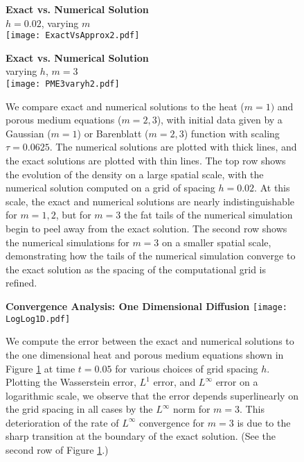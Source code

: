 \documentclass[11pt,leqno]{amsart}
\theoremstyle{definition}
\begin{document}
\begin{figure}[!ht] 
\centering
\textbf{Exact vs. Numerical Solution} \\
$h = 0.02$, varying $m$ \\ \smallskip
\hspace*{-1.4cm}
\texttt{[image: ExactVsApprox2.pdf]}

\textbf{Exact vs. Numerical Solution} \\
varying $h$, $m = 3$ \\ \smallskip
\hspace*{-1.35cm}
\texttt{[image: PME3varyh2.pdf]}
	\caption{We compare exact and numerical solutions to the heat ($m=1)$ and porous medium equations ($m=2,3$), with initial data given by a Gaussian ($m=1$) or Barenblatt ($m=2, 3$) function with scaling $\tau = 0.0625$. The numerical solutions are plotted with thick lines, and the exact solutions are plotted with thin lines. The top row shows the evolution of the density on a large spatial scale, with the numerical solution computed on a grid of spacing $h=0.02$. At this scale, the exact and numerical solutions are nearly indistinguishable  for $m=1,2$, but for $m=3$ the fat tails of the numerical simulation begin to peel away from the exact solution. The second row shows the numerical simulations for $m=3$ on a smaller spatial scale, demonstrating how the tails of the numerical simulation converge to the exact solution as the spacing of the computational grid is refined.}
	\label{exactnumericaldensity}
\end{figure}



\begin{figure}[!ht]
\centering
\textbf{Convergence Analysis: One Dimensional Diffusion}
\hspace*{-1.2cm}
\texttt{[image: LogLog1D.pdf]}
	\caption{We compute the error between the exact and numerical solutions to the one dimensional heat and porous medium equations shown in Figure \ref{exactnumericaldensity} at time $t = 0.05$ for various choices of grid spacing $h$. Plotting the Wasserstein error, $L^1$ error, and $L^\infty$ error on a logarithmic scale, we observe that the error depends superlinearly on the grid spacing in all cases by the $L^\infty$ norm for $m=3$. This deterioration of the rate of $L^\infty$ convergence for $m=3$ is due to the sharp transition at the boundary of the exact solution. (See the second row of Figure \ref{exactnumericaldensity}.) } \label{1Dloglog}
\end{figure}
\end{document}
